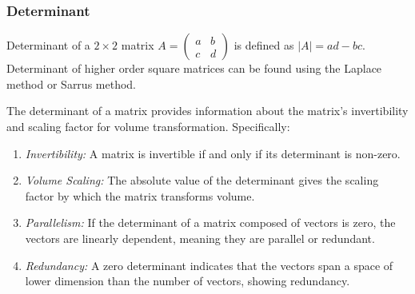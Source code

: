 \documentclass[
  letterpaper,
  DIV=11,
  numbers=noendperiod]{scrreprt}
\theoremstyle{plain}
\theoremstyle{definition}
\theoremstyle{remark}
\begin{document}
\subsubsection*{Determinant}\label{determinant}

Determinant of a \(2\times 2\) matrix
\(A=\begin{pmatrix}a&b\\c&d\end{pmatrix}\) is defined as \(|A|=ad-bc\).
Determinant of higher order square matrices can be found using the
Laplace method or Sarrus method.

The determinant of a matrix provides information about the matrix's
invertibility and scaling factor for volume transformation.
Specifically:

\begin{enumerate}
\def\labelenumi{\arabic{enumi}.}
\item
  \emph{Invertibility:} A matrix is invertible if and only if its
  determinant is non-zero.
\item
  \emph{Volume Scaling:} The absolute value of the determinant gives the
  scaling factor by which the matrix transforms volume.
\item
  \emph{Parallelism:} If the determinant of a matrix composed of vectors
  is zero, the vectors are linearly dependent, meaning they are parallel
  or redundant.
\item
  \emph{Redundancy:} A zero determinant indicates that the vectors span
  a space of lower dimension than the number of vectors, showing
  redundancy.
\end{enumerate}
\end{document}
